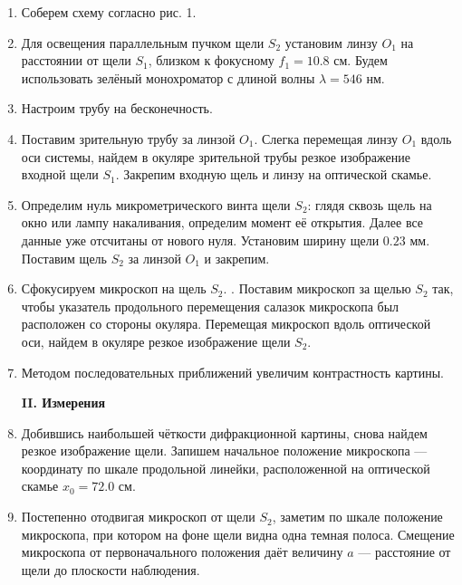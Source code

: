 \documentclass[12pt,a4paper]{article}
\begin{document}
	\begin{enumerate}
		\item Соберем схему согласно рис. 1.
		
		\item Для освещения параллельным пучком щели $S_2$ установим линзу $O_1$ на расстоянии от щели $S_1$, близком к фокусному $f_1 = 10.8$ см. Будем использовать зелёный монохроматор с длиной волны $\lambda = 546$ нм.
		
		\item Настроим трубу на бесконечность.
		
		\item Поставим зрительную трубу за линзой $O_1$.
		Слегка перемещая линзу $O_1$ вдоль оси системы, найдем в окуляре зрительной трубы резкое изображение входной щели $S_1$. Закрепим входную щель и линзу на оптической скамье.
		
		\item Определим нуль микрометрического винта щели $S_2$: глядя сквозь щель на окно или лампу накаливания, определим момент её открытия. Далее все данные уже отсчитаны от нового нуля. Установим ширину щели $0.23$ мм. Поставим щель $S_2$ за линзой $O_1$ и закрепим.
		
		\item Сфокусируем микроскоп на щель $S_2$. . Поставим микроскоп за щелью $S_2$ так, чтобы указатель продольного перемещения салазок микроскопа был расположен со стороны окуляра. Перемещая микроскоп вдоль оптической оси, найдем в окуляре резкое изображение щели $S_2$.
		
		\item Методом последовательных приближений увеличим контрастность картины.
		
		
		\begin{center}
			\textbf{II. Измерения}
		\end{center}
		
		\item Добившись наибольшей чёткости дифракционной картины, снова найдем резкое изображение щели. Запишем начальное положение микроскопа — координату по шкале продольной линейки, расположенной на оптической скамье $x_0 = 72.0$ см.
		
		\item Постепенно отодвигая микроскоп от щели $S_2$, заметим по шкале положение микроскопа, при котором на фоне щели видна одна темная полоса. Смещение микроскопа от первоначального положения даёт величину $a$ — расстояние от щели до плоскости наблюдения.
		

\end{enumerate}
\end{document}
